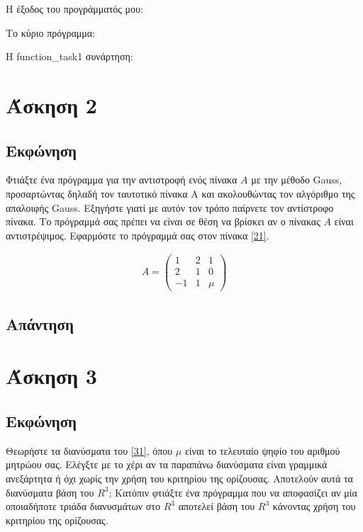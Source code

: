 \documentclass[14pt]{extreport}
\begin{document}
Η έξοδος του προγράμματός μου:

\newpage
Το κύριο πρόγραμμα:


\newpage
Η function\_task1 συνάρτηση:




\chapter{Άσκηση 2}
\section{Εκφώνηση}

Φτιάξτε ένα πρόγραμμα για την αντιστροφή ενός πίνακα $A$ με την μέθοδο Gauss, προσαρτώντας δηλαδή τον ταυτοτικό πίνακα Α και ακολουθώντας τον αλγόριθμο της απαλοιφής Gauss. Εξηγήστε γιατί με αυτόν τον τρόπο παίρνετε τον αντίστροφο πίνακα. Το πρόγραμμά σας πρέπει να είναι σε θέση να βρίσκει αν ο πίνακας $A$ είναι αντιστρέψιμος. Εφαρμόστε το πρόγραμμά σας στον πίνακα \eqref{21}.

\begin{equation}
    \begin{aligned}
        A = \begin{pmatrix}
            1  & 2 & 1   \\
            2  & 1 & 0   \\
            -1 & 1 & \mu
        \end{pmatrix}\label{21}
    \end{aligned}
\end{equation}


\newpage
\section{Απάντηση}

\chapter{Άσκηση 3}
\section{Εκφώνηση}

Θεωρήστε τα διανύσματα του \eqref{31}, όπου $\mu$ είναι το τελευταίο ψηφίο του αριθμού μητρώου σας. Ελέγξτε με το χέρι αν τα παραπάνω διανύσματα είναι γραμμικά ανεξάρτητα ή όχι χωρίς την χρήση του κριτηρίου της ορίζουσας. Αποτελούν αυτά τα διανύσματα βάση του $R^{3}$; Κατόπιν φτιάξτε ένα πρόγραμμα που να αποφασίζει αν μία οποιαδήποτε τριάδα διανυσμάτων στο $R^{3}$ αποτελεί βάση του $R^{3}$ κάνοντας χρήση του κριτηρίου της ορίζουσας.
\end{document}
